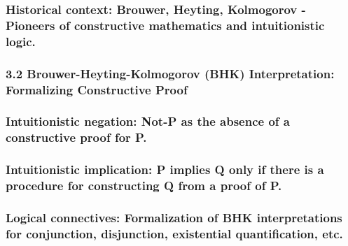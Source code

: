 \hypertarget{historical-context-brouwer-heyting-kolmogorov---pioneers-of-constructive-mathematics-and-intuitionistic-logic.}{%
\subsubsection{Historical context: Brouwer, Heyting, Kolmogorov -
Pioneers of constructive mathematics and intuitionistic
logic.}\label{historical-context-brouwer-heyting-kolmogorov---pioneers-of-constructive-mathematics-and-intuitionistic-logic.}}

\hypertarget{brouwer-heyting-kolmogorov-bhk-interpretation-formalizing-constructive-proof}{%
\subsubsection*{\texorpdfstring{\textbf{3.2 Brouwer-Heyting-Kolmogorov
(BHK) Interpretation: Formalizing Constructive
Proof}}{3.2 Brouwer-Heyting-Kolmogorov (BHK) Interpretation: Formalizing Constructive Proof}}\label{brouwer-heyting-kolmogorov-bhk-interpretation-formalizing-constructive-proof}}

\hypertarget{intuitionistic-negation-not-p-as-the-absence-of-a-constructive-proof-for-p.}{%
\subsubsection{Intuitionistic negation: Not-P as the absence of a
constructive proof for
P.}\label{intuitionistic-negation-not-p-as-the-absence-of-a-constructive-proof-for-p.}}

\hypertarget{intuitionistic-implication-p-implies-q-only-if-there-is-a-procedure-for-constructing-q-from-a-proof-of-p.}{%
\subsubsection{Intuitionistic implication: P implies Q only if there is
a procedure for constructing Q from a proof of
P.}\label{intuitionistic-implication-p-implies-q-only-if-there-is-a-procedure-for-constructing-q-from-a-proof-of-p.}}

\hypertarget{logical-connectives-formalization-of-bhk-interpretations-for-conjunction-disjunction-existential-quantification-etc.}{%
\subsubsection{Logical connectives: Formalization of BHK interpretations
for conjunction, disjunction, existential quantification,
etc.}\label{logical-connectives-formalization-of-bhk-interpretations-for-conjunction-disjunction-existential-quantification-etc.}}

